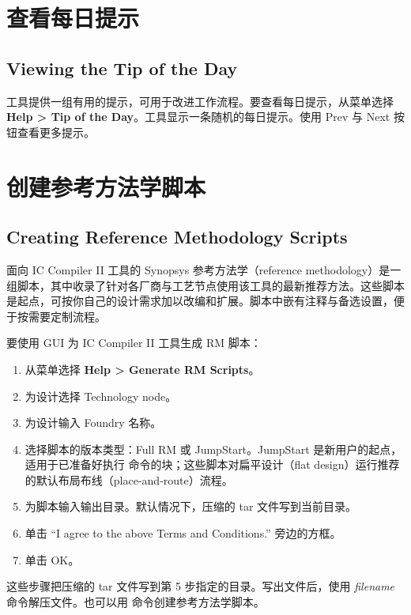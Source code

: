 \section{查看每日提示}
\subsection*{Viewing the Tip of the Day}

工具提供一组有用的提示，可用于改进工作流程。要查看每日提示，从菜单选择 \textbf{Help > Tip of the Day}。工具显示一条随机的每日提示。使用 Prev 与 Next 按钮查看更多提示。

\section{创建参考方法学脚本}
\subsection*{Creating Reference Methodology Scripts}

面向 IC Compiler II 工具的 Synopsys 参考方法学（reference methodology）是一组脚本，其中收录了针对各厂商与工艺节点使用该工具的最新推荐方法。这些脚本是起点，可按你自己的设计需求加以改编和扩展。脚本中嵌有注释与备选设置，便于按需要定制流程。

要使用 GUI 为 IC Compiler II 工具生成 RM 脚本：
\begin{enumerate}
  \item 从菜单选择 \textbf{Help > Generate RM Scripts}。
  \item 为设计选择 Technology node。
  \item 为设计输入 Foundry 名称。
  \item 选择脚本的版本类型：Full RM 或 JumpStart。JumpStart 是新用户的起点，适用于已准备好执行  命令的块；这些脚本对扁平设计（flat design）运行推荐的默认布局布线（place-and-route）流程。
  \item 为脚本输入输出目录。默认情况下，压缩的 tar 文件写到当前目录。
  \item 单击 “I agree to the above Terms and Conditions.” 旁边的方框。
  \item 单击 OK。
\end{enumerate}

这些步骤把压缩的 tar 文件写到第 5 步指定的目录。写出文件后，使用  \textit{filename} 命令解压文件。也可以用  命令创建参考方法学脚本。

